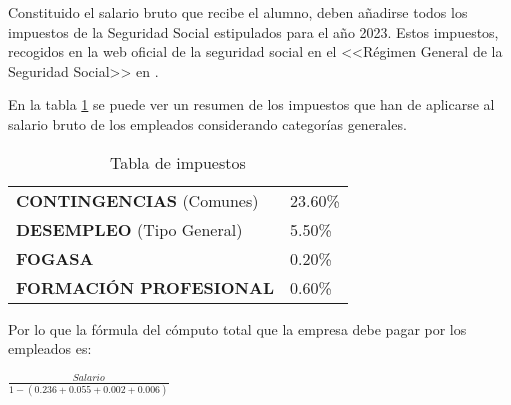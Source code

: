 Constituido el salario bruto que recibe el alumno, deben añadirse todos los
impuestos de la Seguridad Social estipulados para el año 2023. Estos impuestos,
recogidos en la web oficial de la seguridad social en el <<Régimen General de la
Seguridad Social>> en \cite{cotizacion2023}.

En la tabla \ref{tabla:seg-social} se puede ver un resumen de los impuestos que
han de aplicarse al salario bruto de los empleados considerando categorías
generales.

\begin{table}[H]
    \centering
    \begin{tabular}{ll}
    \textbf{CONTINGENCIAS}   (Comunes)  & 23.60\% \\
    \textbf{DESEMPLEO}   (Tipo General) & 5.50\%  \\
    \textbf{FOGASA}                     & 0.20\%  \\
    \textbf{FORMACIÓN PROFESIONAL}      & 0.60\% 
    \end{tabular}%
    \caption{Tabla de impuestos}
    \label{tabla:seg-social}
\end{table}

Por lo que la fórmula del cómputo total que la empresa debe pagar por los
empleados es:

\begin{center}
$ \frac{Salario}{1-(0.236+0.055+0.002+0.006)}$
\end{center}

\begin{table}[H]
\caption{Salarios brutos y coste que supone a la empresa}
\label{table:salarios}
\end{table}

